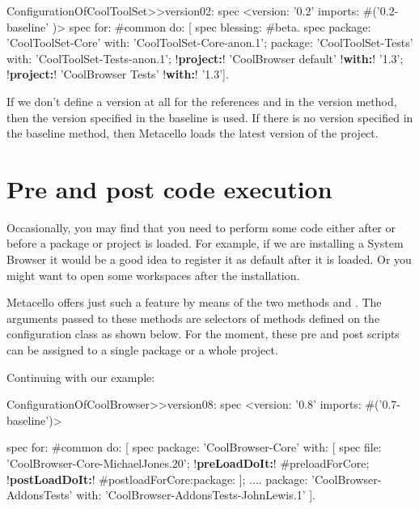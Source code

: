 \documentclass[a4paper,10pt,twoside]{book}
\begin{document}
\begin{code}{}
ConfigurationOfCoolToolSet>>version02: spec 
	<version: '0.2' imports: #('0.2-baseline' )>
	spec for: #common do: [
		spec blessing: #beta.
		spec 
			package: 'CoolToolSet-Core' with: 'CoolToolSet-Core-anon.1';
			package: 'CoolToolSet-Tests' with: 'CoolToolSet-Tests-anon.1';
			!\textbf{project:}! 'CoolBrowser default' !\textbf{with:}! '1.3';
			!\textbf{project:}! 'CoolBrowser Tests' !\textbf{with:}! '1.3'].
\end{code}

If we don't define a version at all for the references   and  in the version method, then the version specified in the baseline is used. If there is no version specified in the baseline method, then Metacello loads the latest version of the project.

\section{Pre and post code execution}

Occasionally, you may find that you need to perform some code either after or before a package or project is loaded. For example, if we are installing a System Browser it would be a good idea to register it as default after it is loaded. Or you might want to open some workspaces after the installation. 

Metacello offers just such a feature by means of the two methods  and .  The arguments passed to these methods are selectors of methods defined on the configuration class as shown below. For the moment, these pre and post scripts can be assigned to a single package or a whole project. 

Continuing with our example:

\begin{code}{}
ConfigurationOfCoolBrowser>>version08: spec 
	<version: '0.8' imports: #('0.7-baseline')>
	
	spec for: #common do: [
		spec 
			package: 'CoolBrowser-Core' with: [
				spec 
					file: 'CoolBrowser-Core-MichaelJones.20';
					!\textbf{preLoadDoIt:}! #preloadForCore;
					!\textbf{postLoadDoIt:}! #postloadForCore:package: ];
			....
			package: 'CoolBrowser-AddonsTests' with: 'CoolBrowser-AddonsTests-JohnLewis.1' ].
\end{code}
\end{document}
